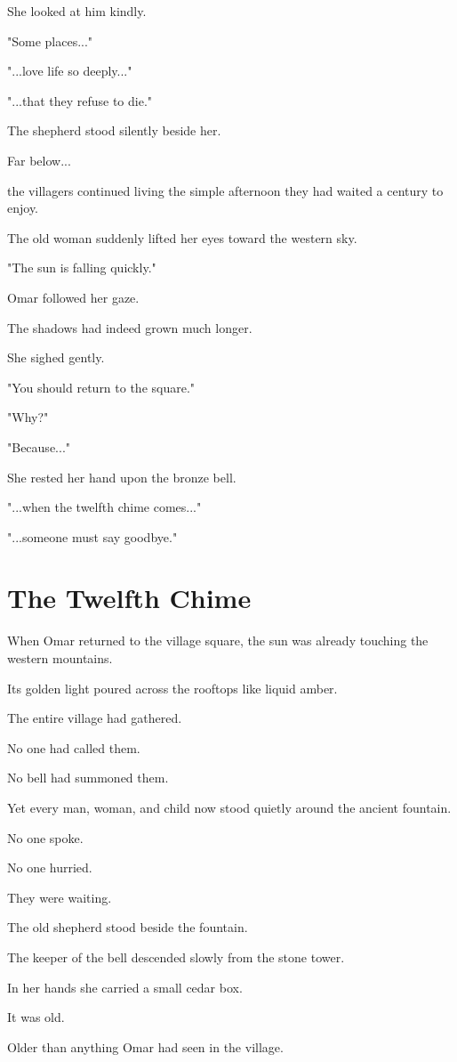 \documentclass[12pt,openany]{book}
\begin{document}
She looked at him kindly.

"Some places..."

"...love life so deeply..."

"...that they refuse to die."

The shepherd stood silently beside her.

Far below...

the villagers continued living the simple afternoon they had waited a century to enjoy.

The old woman suddenly lifted her eyes toward the western sky.

"The sun is falling quickly."

Omar followed her gaze.

The shadows had indeed grown much longer.

She sighed gently.

"You should return to the square."

"Why?"

"Because..."

She rested her hand upon the bronze bell.

"...when the twelfth chime comes..."

"...someone must say goodbye."
\section*{The Twelfth Chime}

When Omar returned to the village square, the sun was already touching the western mountains.

Its golden light poured across the rooftops like liquid amber.

The entire village had gathered.

No one had called them.

No bell had summoned them.

Yet every man, woman, and child now stood quietly around the ancient fountain.

No one spoke.

No one hurried.

They were waiting.

The old shepherd stood beside the fountain.

The keeper of the bell descended slowly from the stone tower.

In her hands she carried a small cedar box.

It was old.

Older than anything Omar had seen in the village.
\end{document}
